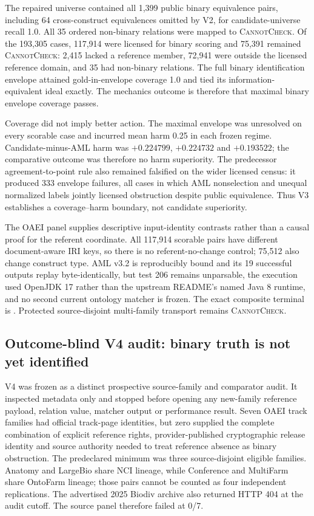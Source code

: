 The repaired universe contained all 1,399 public binary equivalence pairs,
including 64 cross-construct equivalences omitted by V2, for candidate-universe
recall 1.0. All 35 ordered non-binary relations were mapped to
\textsc{CannotCheck}. Of the 193,305 cases, 117,914 were licensed for binary
scoring and 75,391 remained \textsc{CannotCheck}: 2,415 lacked a reference
member, 72,941 were outside the licensed reference domain, and 35 had
non-binary relations. The full binary identification envelope attained
gold-in-envelope coverage 1.0 and tied its information-equivalent ideal
exactly. The mechanics outcome is therefore that maximal binary envelope coverage passes.

Coverage did not imply better action. The maximal envelope was unresolved on
every scorable case and incurred mean harm 0.25 in each frozen regime.
Candidate-minus-AML harm was $+0.224799$, $+0.224732$ and $+0.193522$; the comparative outcome was therefore no harm superiority. The predecessor agreement-to-point rule
also remained falsified on the wider licensed census: it produced 333 envelope
failures, all cases in which AML nonselection and unequal normalized labels
jointly licensed obstruction despite public equivalence. Thus V3 establishes a
coverage--harm boundary, not candidate superiority.

The OAEI panel supplies descriptive input-identity contrasts rather than a
causal proof for the referent coordinate. All 117,914 scorable pairs have
different document-aware IRI keys, so there is no referent-no-change control;
75,512 also change construct type. AML v3.2 is reproducibly bound and its 19
successful outputs replay byte-identically, but test 206 remains unparsable,
the execution used OpenJDK 17 rather than the upstream README's named Java 8
runtime, and no second current ontology matcher is frozen. The exact composite
terminal is
.
Protected source-disjoint multi-family transport remains \textsc{CannotCheck}.

\subsection{Outcome-blind V4 audit: binary truth is not yet identified}

V4 was frozen as a distinct prospective source-family and comparator audit.
It inspected metadata only and stopped before opening any new-family reference
payload, relation value, matcher output or performance result. Seven OAEI track
families had official track-page identities, but zero supplied the complete
combination of explicit reference rights, provider-published cryptographic
release identity and source authority needed to treat reference absence as
binary obstruction. The predeclared minimum was three source-disjoint eligible
families. Anatomy and LargeBio share NCI lineage, while Conference and
MultiFarm share OntoFarm lineage; those pairs cannot be counted as four
independent replications. The advertised 2025 Biodiv archive also returned
HTTP 404 at the audit cutoff. The source panel therefore failed at 0/7.

